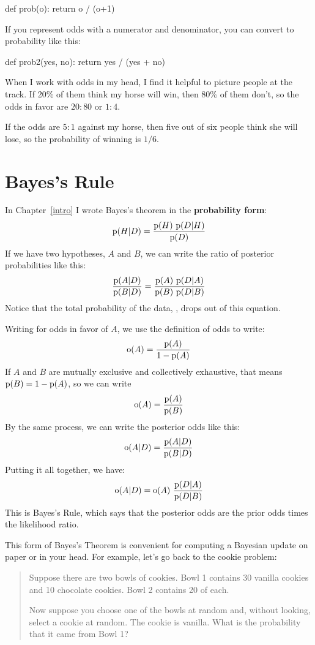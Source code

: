\documentclass[12pt]{book}
\theoremstyle{exercise}
\begin{document}
\begin{code}
def prob(o):
    return o / (o+1)
\end{code}

If you represent odds with a numerator and denominator, you
can convert to probability like this:

\begin{code}
def prob2(yes, no):
    return yes / (yes + no)
\end{code}

When I work with odds in my head, I find it helpful to picture
people at the track.  If 20\% of them think my horse will win,
then 80\% of them don't, so the odds in favor are $20:80$ or
$1:4$.

If the odds are $5:1$ against my horse, then five out of six
people think she will lose, so the probability of winning
is $1/6$.



\section{Bayes's Rule}


In Chapter~\ref{intro} I wrote Bayes's theorem in the {\bf probability
form}:
%
\[ \mathrm{p}(H|D) = \frac{\mathrm{p}(H)~\mathrm{p}(D|H)}{\mathrm{p}(D)} \]
%
If we have two hypotheses, $A$ and $B$, 
we can write the ratio of posterior probabilities like this:
%
\[ \frac{\mathrm{p}(A|D)}{\mathrm{p}(B|D)} = \frac{\mathrm{p}(A)~\mathrm{p}(D|A)}
                                        {\mathrm{p}(B)~\mathrm{p}(D|B)} \]
%
Notice that the total probability of the data, , drops out of
this equation.

Writing  for odds in favor of $A$, we use the definition of odds to write:
%
\[ \mathrm{o}(A) = \frac{\mathrm{p}(A)}{1-\mathrm{p}(A)} \]
%
If $A$ and $B$ are mutually exclusive and collectively exhaustive,
that means $\mathrm{p}(B) = 1 - \mathrm{p}(A)$, so we can write
%
\[ \mathrm{o}(A) = \frac{\mathrm{p}(A)}{\mathrm{p}(B)}  \]
%
By the same process, we can write the posterior odds like this:
%
\[ \mathrm{o}(A|D) = \frac{\mathrm{p}(A|D)}{\mathrm{p}(B|D)}  \]
%
Putting it all together, we have:
%
\[ \mathrm{o}(A|D) = \mathrm{o}(A)~\frac{\mathrm{p}(D|A)}{\mathrm{p}(D|B)} \]
%
This is Bayes's Rule, which says that the posterior odds are the prior odds times the likelihood ratio.  

This form of Bayes's Theorem is convenient for computing a Bayesian update on paper or in your head.  
For example, let's go back to the cookie problem:

\begin{quote}
Suppose there are two bowls of cookies.  
Bowl 1 contains 30 vanilla cookies and 10 chocolate cookies.
Bowl 2 contains 20 of each.

Now suppose you choose one of the bowls at random and, without
looking, select a cookie at random.  
The cookie is vanilla.  
What is the probability that it came from Bowl 1?
\end{quote}
\end{document}
